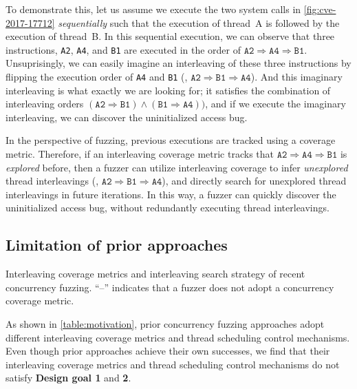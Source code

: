To demonstrate this, let us assume we execute the two system calls in
\autoref{fig:cve-2017-17712} \textit{sequentially} such that the
execution of thread~A is followed by the execution of thread~B.
%
In this sequential execution, we can observe that three instructions,
\texttt{A2}, \texttt{A4}, and \texttt{B1} are executed in the order of
$\texttt{A2} \Rightarrow \texttt{A4} \Rightarrow \texttt{B1}$.
%
Unsuprisingly, we can easily imagine an interleaving of these three
instructions by flipping the execution order of \texttt{A4} and
\texttt{B1} (\ie,
$\texttt{A2} \Rightarrow \texttt{B1} \Rightarrow \texttt{A4}$).
%
And this imaginary interleaving is what exactly we are looking for; it
satisfies the combination of interleaving orders
$(\texttt{A2} \Rightarrow \texttt{B1}) \wedge (\texttt{B1} \Rightarrow
\texttt{A4}))$, and if we execute the imaginary interleaving, we can
discover the uninitialized access bug.

%
In the perspective of fuzzing, previous executions are tracked using a
coverage metric.
%
Therefore, if an interleaving coverage metric tracks that
$\texttt{A2} \Rightarrow \texttt{A4} \Rightarrow \texttt{B1}$ is
\textit{explored} before, then a fuzzer can utilize interleaving
coverage to infer \textit{unexplored} thread interleavings (\eg,
$\texttt{A2} \Rightarrow \texttt{B1} \Rightarrow \texttt{A4}$), and
directly search for unexplored thread interleavings in future
iterations.
%
In this way, a fuzzer can quickly discover the uninitialized access
bug, without redundantly executing thread interleavings.



\subsection{Limitation of prior approaches}
\label{ss:existingapproaches}

\begin{table}[t]
  \centering
  
  \caption{Interleaving coverage metrics and interleaving search
    strategy of recent concurrency fuzzing. ``--'' indicates that a
    fuzzer does not adopt a concurrency coverage metric. }
  \label{table:motivation}
\end{table}

As shown in \autoref{table:motivation}, prior concurrency fuzzing
approaches adopt different interleaving coverage metrics and thread
scheduling control mechanisms.
%
Even though prior approaches achieve their own successes, we find that
their interleaving coverage metrics and thread scheduling control
mechanisms do not satisfy \textbf{Design goal 1} and \textbf{2}.


